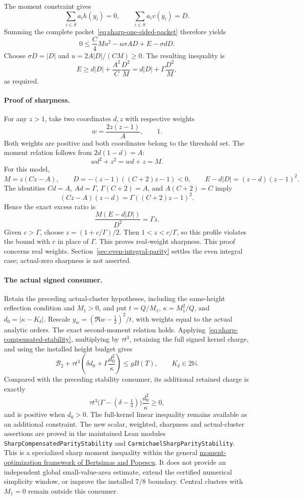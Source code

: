 The moment constraint gives
\[
 \sum_{i\in S}a_i h(y_i)=0,\qquad
 \sum_{i\in S}a_i v(y_i)=D.
\]
Summing the complete packet~\eqref{eq:sharp-one-sided-packet} therefore yields
\[
 0\le\frac C4 M u^2-u\sigma A D+E-\sigma dD.
\]
Choose \(\sigma D=|D|\) and \(u=2A|D|/(CM)\ge0\).
The resulting inequality is
\[
 E\ge d|D|+\frac{A^2}{C}\frac{D^2}{M}
       =d|D|+\Gamma\frac{D^2}{M},
\]
as required.

\paragraph{Proof of sharpness.}
For any \(z>1\), take two coordinates \(d,z\) with respective weights
\[
 w=\frac{2z(z-1)}A,\qquad1.
\]
Both weights are positive and both coordinates belong to the threshold
set.  The moment relation follows from \(2d(1-d)=A\):
\[
 wd^2+z^2=wd+z=M.
\]
For this model,
\[
 M=z(Cz-A),\qquad
 D=-(z-1)((C+2)z-1)<0,\qquad
 E-d|D|=(z-d)(z-1)^2.
\]
The identities \(Cd=A\), \(Ad=\Gamma\),
\(\Gamma(C+2)=A\), and \(A(C+2)=C\) imply
\[
 (Cz-A)(z-d)=\Gamma((C+2)z-1)^2.
\]
Hence the exact excess ratio is
\[
 \frac{M(E-d|D|)}{D^2}=\Gamma z.
\]
Given \(c>\Gamma\), choose \(z=(1+c/\Gamma)/2\).
Then \(1<z<c/\Gamma\), so this profile violates the bound with
\(c\) in place of \(\Gamma\).  This proves real-weight sharpness.
This proof concerns real weights.  Section~\ref{sec:even-integral-parity}
settles the even integral case; actual-zero sharpness is not asserted.

\paragraph{The actual signed consumer.}
Retain the preceding actual-cluster hypotheses, including the same-height
reflection condition and \(M_1>0\), and put
\(t=Q/M_1\), \(\kappa=M_1^2/Q\), and \(d_0=|\kappa-K_\delta|\).
Rescale \(y_w=(\Re w-\tfrac12)^2/t\), with weights equal to the
actual analytic orders.  The exact second-moment relation holds.
Applying~\eqref{eq:sharp-compensated-stability}, multiplying by
\(\tau t^3\), retaining the full signed kernel charge, and using the
installed height budget gives
\begin{equation}\label{eq:actual-sharp-parity-stability}
 \mathcal B_2+\tau t^3
   \left(\delta d_0+\Gamma\frac{d_0^2}{\kappa}\right)
 \le gB(T),\qquad K_\delta\in2\mathbb N.
\end{equation}
Compared with the preceding stability consumer, its additional retained
charge is exactly
\[
 \tau t^3\bigl(\Gamma-(\delta-\tfrac14)\bigr)\frac{d_0^2}{\kappa}
 \ge0,
\]
and is positive when \(d_0>0\).  The full-kernel linear inequality remains
available as an additional constraint.
The new scalar, weighted, sharpness and actual-cluster assertions are
proved in the maintained Lean modules
\texttt{SharpCompensatedParityStability} and
\texttt{CarmichaelSharpParityStability}.
This is a specialized sharp moment inequality within the general
\href{https://epubs.siam.org/doi/10.1137/S1052623401399903}
{moment-optimization framework of Bertsimas and Popescu}.
It does not provide an independent global small-value-area estimate,
extend the certified numerical simplicity window, or improve the
installed \(7/8\) boundary.  Central clusters with \(M_1=0\) remain
outside this consumer.

